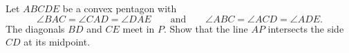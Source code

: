 Let $ABCDE$ be a convex pentagon with
$$\angle BAC = \angle CAD = \angle DAE \qquad
\text{and} \qquad \angle ABC = \angle ACD = \angle ADE.$$
The diagonals $BD$ and $CE$ meet in $P$.
Show that the line $AP$ intersects the side $CD$ at its midpoint.